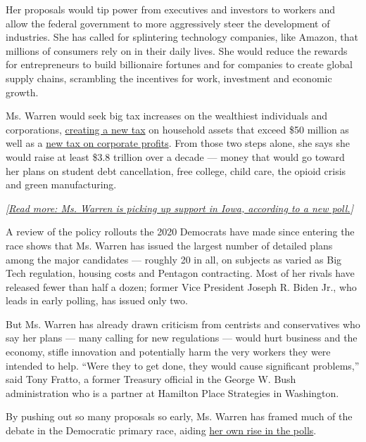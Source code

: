 Her proposals would tip power from executives and investors to workers
and allow the federal government to more aggressively steer the
development of industries. She has called for splintering technology
companies, like Amazon, that millions of consumers rely on in their
daily lives. She would reduce the rewards for entrepreneurs to build
billionaire fortunes and for companies to create global supply chains,
scrambling the incentives for work, investment and economic growth.

Ms. Warren would seek big tax increases on the wealthiest individuals
and corporations,
\href{https://www.nytimes3xbfgragh.onion/2019/01/24/us/politics/wealth-tax-democrats.html}{creating
a new tax} on household assets that exceed \$50 million as well as a
\href{https://www.nytimes3xbfgragh.onion/2019/04/29/us/politics/democrats-taxes-2020.html}{new
tax on corporate profits}. From those two steps alone, she says she
would raise at least \$3.8 trillion over a decade --- money that would
go toward her plans on student debt cancellation, free college, child
care, the opioid crisis and green manufacturing.

\emph{{[}}\href{https://www.nytimes3xbfgragh.onion/2019/06/08/us/politics/iowa-poll-2020-democrats.html?action=click\&module=Intentional\&pgtype=Article}{\emph{Read
more: Ms. Warren is picking up support in Iowa, according to a new
poll.}}\emph{{]}}

A review of the policy rollouts the 2020 Democrats have made since
entering the race shows that Ms. Warren has issued the largest number of
detailed plans among the major candidates --- roughly 20 in all, on
subjects as varied as Big Tech regulation, housing costs and Pentagon
contracting. Most of her rivals have released fewer than half a dozen;
former Vice President Joseph R. Biden Jr., who leads in early polling,
has issued only two.

But Ms. Warren has already drawn criticism from centrists and
conservatives who say her plans --- many calling for new regulations ---
would hurt business and the economy, stifle innovation and potentially
harm the very workers they were intended to help. ``Were they to get
done, they would cause significant problems,'' said Tony Fratto, a
former Treasury official in the George W. Bush administration who is a
partner at Hamilton Place Strategies in Washington.

By pushing out so many proposals so early, Ms. Warren has framed much of
the debate in the Democratic primary race, aiding
\href{https://www.nytimes3xbfgragh.onion/2019/06/08/us/politics/iowa-poll-2020-democrats.html}{her
own rise in the polls}.

